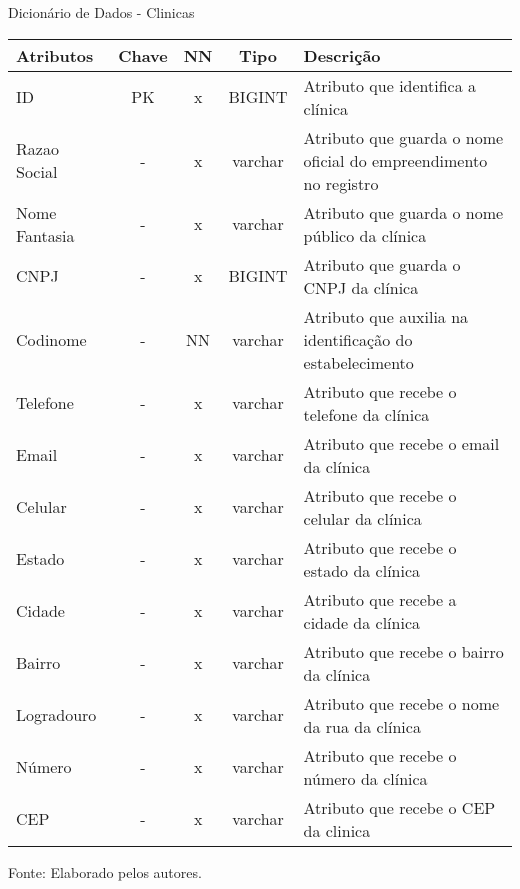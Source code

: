 \documentclass[
    12pt,               %
    openright,          %
    oneside,
    a4paper,            %
    BIBLATEX,           %
    TODO,               %
    english,            %
    brazil              %
    ]{ifsp-spo-inf-ctds}
\begin{document}
      \begin{center}
      \begin{quadro}[H]
      \centering
          \caption{Dicionário de Dados - Clinicas}
          \begin{tabulary}{1.0\textwidth}{|p{9em}|c|c|c|p{19em}|}
        \hline
        Atributos & Chave & NN & Tipo & Descrição\\
        \hline
        ID & PK & x & BIGINT & Atributo que identifica a clínica \\
        \hline
        Razao Social & - & x & varchar & Atributo que guarda o nome oficial do empreendimento no registro\\
        \hline
        Nome Fantasia & - & x & varchar & Atributo que guarda o nome público da clínica\\
        \hline
        CNPJ & - & x & BIGINT & Atributo que guarda o CNPJ da clínica \\
        \hline
        Codinome & - & NN & varchar & Atributo que auxilia na identificação do estabelecimento\\
        \hline
        Telefone & - & x & varchar & Atributo que recebe o telefone da clínica\\
        \hline
        Email & - & x & varchar & Atributo que recebe o email da clínica\\
        \hline
        Celular & - & x & varchar & Atributo que recebe o celular da clínica \\
        \hline
        Estado & - & x & varchar & Atributo que recebe o estado da clínica\\
        \hline
        Cidade & - & x & varchar & Atributo que recebe a cidade da clínica \\
        \hline
        Bairro & - & x & varchar & Atributo que recebe o bairro da clínica \\
        \hline
        Logradouro & - & x & varchar & Atributo que recebe o nome da rua da clínica\\
        \hline
        Número & - & x & varchar & Atributo que recebe o número da clínica \\
        \hline
        CEP & - & x & varchar &  Atributo que recebe o CEP da clinica\\
        \hline
        \end{tabulary}
         
          \label{qd: md-clinica}
          \centering
        {\footnotesize Fonte: Elaborado pelos autores.}
      \end{quadro}
    \end{center}
\end{document}

